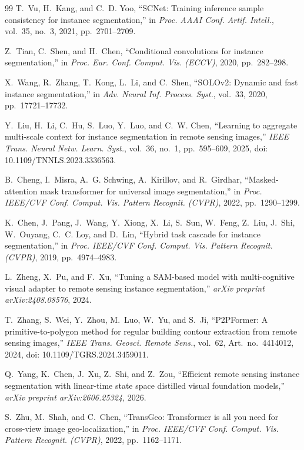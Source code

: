 \documentclass[letterpaper,journal]{IEEEtran}
\begin{document}
\begin{thebibliography}{99}
T.~Vu, H.~Kang, and C.~D. Yoo, ``SCNet: Training inference sample consistency for instance segmentation,'' in \textit{Proc. AAAI Conf. Artif. Intell.}, vol.~35, no.~3, 2021, pp.~2701--2709.

Z.~Tian, C.~Shen, and H.~Chen, ``Conditional convolutions for instance segmentation,'' in \textit{Proc. Eur. Conf. Comput. Vis. (ECCV)}, 2020, pp.~282--298.

X.~Wang, R.~Zhang, T.~Kong, L.~Li, and C.~Shen, ``SOLOv2: Dynamic and fast instance segmentation,'' in \textit{Adv. Neural Inf. Process. Syst.}, vol.~33, 2020, pp.~17721--17732.

Y.~Liu, H.~Li, C.~Hu, S.~Luo, Y.~Luo, and C.~W. Chen, ``Learning to aggregate multi-scale context for instance segmentation in remote sensing images,'' \textit{IEEE Trans. Neural Netw. Learn. Syst.}, vol.~36, no.~1, pp.~595--609, 2025, doi: 10.1109/TNNLS.2023.3336563.

B.~Cheng, I.~Misra, A.~G. Schwing, A.~Kirillov, and R.~Girdhar, ``Masked-attention mask transformer for universal image segmentation,'' in \textit{Proc. IEEE/CVF Conf. Comput. Vis. Pattern Recognit. (CVPR)}, 2022, pp.~1290--1299.

K.~Chen, J.~Pang, J.~Wang, Y.~Xiong, X.~Li, S.~Sun, W.~Feng, Z.~Liu, J.~Shi, W.~Ouyang, C.~C. Loy, and D.~Lin, ``Hybrid task cascade for instance segmentation,'' in \textit{Proc. IEEE/CVF Conf. Comput. Vis. Pattern Recognit. (CVPR)}, 2019, pp.~4974--4983.

L.~Zheng, X.~Pu, and F.~Xu, ``Tuning a SAM-based model with multi-cognitive visual adapter to remote sensing instance segmentation,'' \textit{arXiv preprint arXiv:2408.08576}, 2024.

T.~Zhang, S.~Wei, Y.~Zhou, M.~Luo, W.~Yu, and S.~Ji, ``P2PFormer: A primitive-to-polygon method for regular building contour extraction from remote sensing images,'' \textit{IEEE Trans. Geosci. Remote Sens.}, vol.~62, Art.~no.~4414012, 2024, doi: 10.1109/TGRS.2024.3459011.

Q.~Yang, K.~Chen, J.~Xu, Z.~Shi, and Z.~Zou, ``Efficient remote sensing instance segmentation with linear-time state space distilled visual foundation models,'' \textit{arXiv preprint arXiv:2606.25324}, 2026.

S.~Zhu, M.~Shah, and C.~Chen, ``TransGeo: Transformer is all you need for cross-view image geo-localization,'' in \textit{Proc. IEEE/CVF Conf. Comput. Vis. Pattern Recognit. (CVPR)}, 2022, pp.~1162--1171.


\end{thebibliography}
\end{document}
